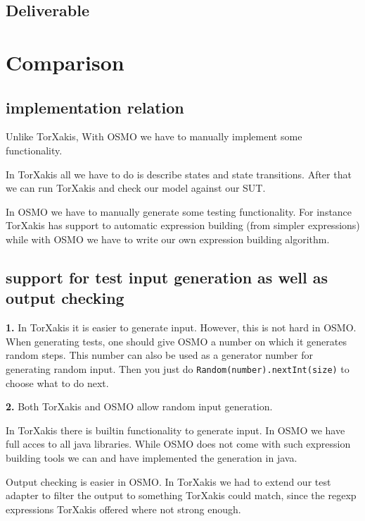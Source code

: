 \documentclass[11pt,a4paper]{article}
\begin{document}
\subsection{Deliverable}


\section{Comparison}
\subsection{implementation relation}
Unlike TorXakis, With OSMO we have to manually implement some functionality.

In TorXakis all we have to do is describe states and state
transitions. After that we can run TorXakis and check our model
against our SUT.

In OSMO we have to manually generate some testing functionality. For
instance TorXakis has support to automatic expression building (from
simpler expressions) while with OSMO we have to write our own
expression building algorithm.

\subsection{support for test input generation as well as output checking}
\textbf{1.}
In TorXakis it is easier to generate input. However, this is not hard in OSMO. When generating tests, one should give OSMO a number on which it generates random steps. This number can also be used as a generator number for generating random input. Then you just do \verb|Random(number).nextInt(size)| to choose what to do next.

\textbf{2.}
Both TorXakis and OSMO allow random input generation.

In TorXakis there is builtin functionality to generate input. In OSMO
we have full acces to all java libraries. While OSMO does not come
with such expression building tools we can and have implemented the
generation in java.


Output checking is easier in OSMO. In TorXakis we had to extend our test adapter to filter the output to something TorXakis could match, since the regexp expressions TorXakis offered where not strong enough.
\end{document}

